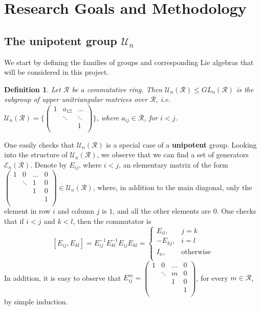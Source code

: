 \documentclass[12pt]{article}
\newtheorem{definition}[theorem]{Definition}
\begin{document}
\section{Research Goals and Methodology}
\subsection{The unipotent group $\mathcal{U}_n$}
We start by defining the families of groups and corresponding Lie algebras that will be considered in this project.
\begin{definition}
\label{def.unipotent.matrix}
Let $\mathcal{R}$ be a commutative ring. Then $\mathcal{U}_n(\mathcal{R})\leq GL_n(\mathcal{R})$ is the subgroup of upper unitriangular matrices over $\mathcal{R}$, i.e. $\mathcal{U}_n(\mathcal{R})=\Bigg\{
\begin{pmatrix}
1 & a_{12} &\dots\\
  & \ddots & \ddots\\
  & & 1\\
\end{pmatrix}\Bigg\}$, where $a_{ij}\in\mathcal{R}$, for $i<j$.
\end{definition}
 One easily checks that $\mathcal{U}_n(\mathcal{R})$ is a special case of a \textbf{unipotent} group.
Looking into the structure of $\mathcal{U}_n(\mathcal{R})$, we observe that we can find a set of generators $\mathcal{E}_n(\mathcal{R})$. Denote by $E_{ij}$, where $i<j$, an elementary matrix of the form $\begin{pmatrix}
1 & 0 & \dots & 0\\
  & \ddots & 1 & 0\\
  &  & 1 & 0\\
  & & & 1\\
  \end{pmatrix}\in \mathcal{U}_n(\mathcal{R})$, where, in addition to the main diagonal, only the element in row $i$ and column $j$ is $1$, and all the other elements are $0$. One checks that if $i<j$ and $k<l$, then the commutator is \[
  [E_{ij},E_{kl}]=E_{ij}^{-1}E_{kl}^{-1}E_{ij}E_{kl}=\begin{cases}
    E_{il}, & j=k\\
    -E_{kj}, & {i=l}\\
    I_n, & \text{otherwise}\\
    \end{cases}
    \]
  In addition, it is easy to observe that $E_{ij}^m=\begin{pmatrix}
1 & 0 & \dots & 0\\
  & \ddots & m & 0\\
  &  & 1 & 0\\
  & & & 1\\
  \end{pmatrix}$, for every $m\in\mathcal{R}$, by simple induction.
\end{document}
